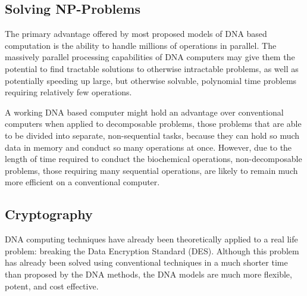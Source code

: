 \documentclass[a4paper]{article}
\begin{document}
\subsection{Solving NP-Problems} %
\label{sub:subsection_name}
The primary advantage offered by most proposed models of DNA based computation is the ability to handle millions of operations in parallel. The massively parallel processing capabilities of DNA computers may give them the potential to find tractable solutions to otherwise intractable problems, as well as potentially speeding up large, but otherwise solvable, polynomial time problems requiring relatively few operations.

A working DNA based computer might hold an advantage over conventional computers when applied to decomposable problems, those problems that are able to be divided into separate, non-sequential tasks, because they can hold so much data in memory and conduct so many operations at once. However, due to the length of time required to conduct the biochemical operations, non-decomposable problems, those requiring many sequential operations, are likely to remain much more efficient on a conventional computer. 
\subsection{Cryptography} %
\label{sub:subsection_name}
 DNA computing techniques have already been theoretically applied to a real life problem: breaking the Data Encryption Standard (DES). Although this problem has already been solved using conventional techniques in a much shorter time than proposed by the DNA methods, the DNA models are much more flexible, potent, and  cost effective.
\end{document}
